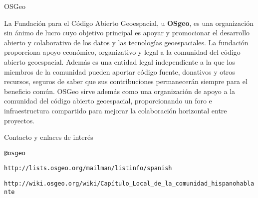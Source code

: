\documentclass[11pt,a5]{article}
\newcommand{\web}[1]{\texttt{\color{VerdeOscuro2!50!black}\large #1}}
\newcommand{\alert}[1]{\textbf{\color{VerdeOscuro2!80!black}#1}}
\begin{document}
\sffamily


\begin{center}
\color{VerdeOscuro2!50!black}\huge OSGeo
\end{center}

La Fundación para el Código Abierto Geoespacial, u \alert{OSgeo}, es una
organización sin ánimo de lucro cuyo objetivo principal es apoyar y promocionar
el desarrollo abierto y colaborativo de los datos y las tecnologías
geoespaciales. La fundación proporciona apoyo económico, organizativo y legal a
la comunidad del código abierto geoespacial. Además es una entidad legal
independiente a la que los miembros de la comunidad pueden aportar código
fuente, donativos y otros recursos, seguros de saber que sus contribuciones
permanecerán siempre para el beneficio común. OSGeo sirve además como una
organización de apoyo a la comunidad del código abierto geoespacial,
proporcionando un foro e infraestructura compartido para mejorar la colaboración
horizontal entre proyectos.

\begin{center}
\color{VerdeOscuro2!50!black}\Large Contacto y enlaces de interés
\end{center}
\begin{center}
\begin{minipage}{0.2\textwidth}
 \large
    \begin{mdframed}[style=CajaContactos, frametitle={\Large\color{green!10!white} Twitter}]
      \web{@osgeo}
    \end{mdframed}
\end{minipage}
%
\begin{minipage}{0.65\textwidth}
  \large
    \begin{mdframed}[style=CajaContactos, frametitle={\Large\color{green!10!white} Lista de correo}]
      \web{http://lists.osgeo.org/mailman/listinfo/spanish}
    \end{mdframed}
\end{minipage}
\begin{minipage}{0.90\textwidth}
  \large
    \begin{mdframed}[style=CajaContactos, frametitle={\Large\color{green!10!white} Wiki}]
      \web{http://wiki.osgeo.org/wiki/Capítulo\_Local\_de\_la\_comunidad\_hispanohablante}
    \end{mdframed}
\end{minipage}
\end{center}
\end{document}
